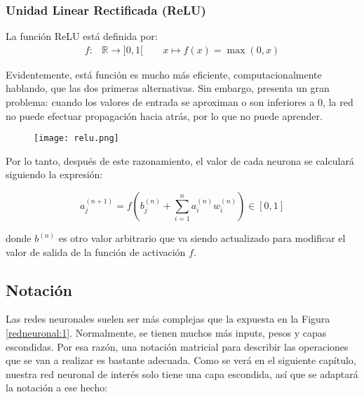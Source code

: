 \subsubsection{Unidad Linear Rectificada (ReLU)}

La función ReLU está definida por:
\begin{align*}
    f \colon & \mathbb{R} \longrightarrow ]0,1[ \
    \quad    & x \longmapsto f(x) = \max(0,x)
\end{align*}

Evidentemente, está función es mucho más eficiente, computacionalmente hablando, que las dos primeras alternativas. Sin embargo, presenta un gran problema: cuando los valores de entrada se aproximan o son inferiores a 0, la red no puede efectuar propagación hacia atrás, por lo que no puede aprender.

\begin{figure}[H]
    \texttt{[image: relu.png]}
    \centering
\end{figure}


Por lo tanto, después de este razonamiento, el valor de cada neurona se calculará siguiendo la expresión:

\begin{equation}
    \label{eqn:1}
    a^{(n+1)}_j = f\left( b^{(n)}_j + \sum_{i=1}^n a^{(n)}_i w^{(n)}_i \right) \in [0,1]
\end{equation}

donde $b^{(n)}$ es otro valor arbitrario que va siendo actualizado para modificar el valor de salida de la
función de activación $f$.

\subsection{Notación}

Las redes neuronales suelen ser más complejas que la expuesta en la Figura \ref{redneuronal:1}. Normalmente,
se tienen muchos más inputs, pesos y capas escondidas. Por esa razón, una notación matricial para describir
las operaciones que se van a realizar es bastante adecuada. Como se verá en el siguiente capítulo, nuestra
red neuronal de interés solo tiene una capa escondida, así que se adaptará la notación a ese hecho:

